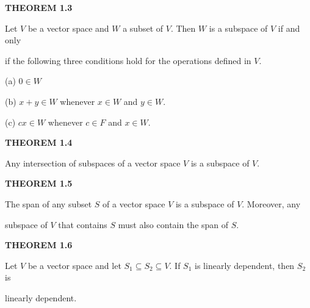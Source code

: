 \documentclass[12pt, a4paper]{article}
\begin{document}
 \vspace{4mm}
 
 \noindent\blacksquare\textbf{ THEOREM 1.3}\par
 
 \vspace{2mm}
 
 Let $V$ be a vector space and $W$ a subset of $V$. Then $W$ is a subspace of $V$ if and only\par if the following three conditions hold for the operations defined in $V$.
 
 \vspace{2mm}
 
 \begin{addmargin}[1.5em]{1.5em}
 
    (a) $0\in W$\par
    \noindent(b) $x+y\in W$ whenever $x\in W$ and $y\in W$.\par
    \noindent(c) $cx\in W$ whenever $c\in F$ and $x\in W$.
 
 \end{addmargin}
 
 \vspace{4mm}
 
 \noindent\blacksquare\textbf{ THEOREM 1.4}\par
 
 \vspace{2mm}
 
 Any intersection of subspaces of a vector space $V$ is a subspace of $V$.
 
 \vspace{4mm}
 
 \noindent\blacksquare\textbf{ THEOREM 1.5}\par
 
 \vspace{2mm}
 
 The span of any subset $S$ of a vector space $V$ is a subspace of $V$. Moreover, any\par subspace of $V$ that contains $S$ must also contain the span of $S$.
 
 \vspace{4mm}
 
 \noindent\blacksquare\textbf{ THEOREM 1.6}
 
 \vspace{2mm}
 
 Let $V$ be a vector space and let $S_1\subseteq S_2\subseteq V$. If $S_1$ is linearly dependent, then $S_2$ is\par linearly dependent.
 
\end{document}
